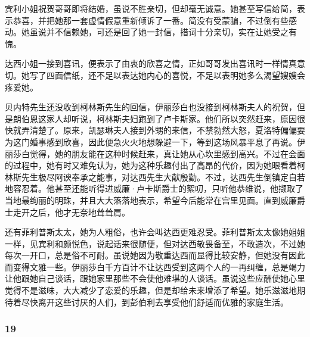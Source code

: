 \par 宾利小姐祝贺哥哥即将结婚，虽说不胜亲切，但却毫无诚意。她甚至写信给简，表示恭喜，并把她那一套虚情假意重新倾诉了一番。简没有受蒙骗，不过倒有些感动。她虽说并不信赖她，可还是回了她一封信，措词十分亲切，实在让她受之有愧。
\par 达西小姐一接到喜讯，便表示了由衷的欣喜之情，正如哥哥发出喜讯时一样情真意切。她写了四面信纸，还不足以表达她内心的喜悦，不足以表明她多么渴望嫂嫂会疼爱她。
\par 贝内特先生还没收到柯林斯先生的回信，伊丽莎白也没接到柯林斯夫人的祝贺，但是朗伯恩这家人却听说，柯林斯夫妇跑到了卢卡斯家。他们所以突然赶来，原因很快就弄清楚了。原来，凯瑟琳夫人接到外甥的来信，不禁勃然大怒，夏洛特偏偏要为这门婚事感到欣喜，因此便急火火地想躲避一下，等到这场风暴平息了再说。伊丽莎白觉得，她的朋友能在这种时候赶来，真让她从心坎里感到高兴。不过在会面的过程中，她有时又难免认为，她为这种乐趣付出了高昂的代价，因为她眼看着柯林斯先生极尽阿谀奉承之能事，对达西先生大献殷勤。不过，达西先生倒镇定自若地容忍着。他甚至还能听得进威廉·卢卡斯爵士的絮叨，只听他恭维说，他撷取了当地最绚丽的明珠，并且大大落落地表示，希望今后能常在宫里见面。直到威廉爵士走开之后，他才无奈地耸耸肩。
\par 还有菲利普斯太太，她为人粗俗，也许会叫达西更难忍受。菲利普斯太太像她姐姐一样，见宾利和颜悦色，说起话来很随便，但对达西敬畏备至，不敢造次，不过她每次一开口，总是俗不可耐。虽说她因为敬重达西而显得比较安静，但她没有因此而变得文雅一些。伊丽莎白千方百计不让达西受到这两个人的一再纠缠，总是竭力让他跟她自己谈话，跟她家里那些不会使他难堪的人谈话。虽说这些应酬使她心里觉得不是滋味，大大减少了恋爱的乐趣，但是却给未来增添了希望。她乐滋滋地期待着尽快离开这些讨厌的人们，到彭伯利去享受他们舒适而优雅的家庭生活。




\subsubsection*{19}


